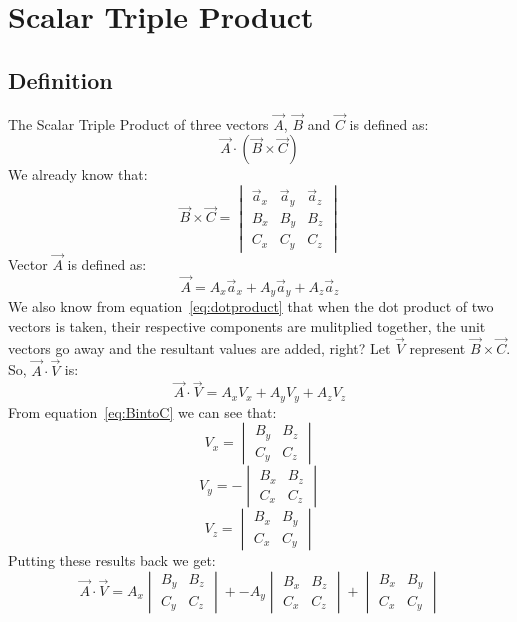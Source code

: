     \section{Scalar Triple Product}
        \subsection{Definition}
            The Scalar Triple Product of three vectors $\vec{A}$, $\vec{B}$ and $\vec{C}$ is defined as:
            $$\vec{A}\cdot\left(\vec{B}\times\vec{C}\right)$$
            We already know that:
            \begin{equation}\label{eq:BintoC}
                \vec{B}\times\vec{C} = \begin{vmatrix}\vec{a}_x & \vec{a}_y & \vec{a}_z \\ B_x & B_y & B_z \\ C_x & C_y & C_z \end{vmatrix}
            \end{equation}
            Vector $\vec{A}$ is defined as:
            $$\vec{A} = A_x\vec{a}_x + A_y\vec{a}_y + A_z\vec{a}_z$$
            We also know from equation~\ref{eq:dotproduct} that when the dot product of two vectors is taken, their respective components are mulitplied together, the unit vectors go away and the resultant values are added, right?
            Let $\vec{V}$ represent $\vec{B}\times\vec{C}$. So, $\vec{A}\cdot\vec{V}$ is:
            $$\vec{A}\cdot\vec{V} = A_xV_x + A_yV_y + A_zV_z$$
            From equation~\ref{eq:BintoC} we can see that:
            $$V_x = \begin{vmatrix}B_y & B_z \\ C_y & C_z\end{vmatrix}$$
            $$V_y = -\begin{vmatrix}B_x & B_z \\ C_x & C_z\end{vmatrix}$$
            $$V_z = \begin{vmatrix}B_x & B_y \\ C_x & C_y\end{vmatrix}$$
            Putting these results back we get:
            $$\vec{A}\cdot\vec{V} = A_x\begin{vmatrix}B_y & B_z \\ C_y & C_z\end{vmatrix} + -A_y\begin{vmatrix}B_x & B_z \\ C_x & C_z\end{vmatrix} + \begin{vmatrix}B_x & B_y \\ C_x & C_y\end{vmatrix}$$ 
